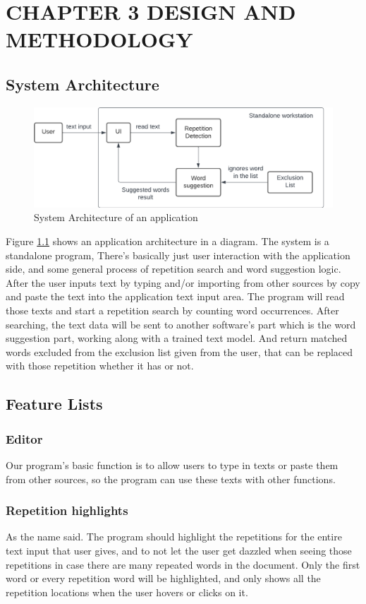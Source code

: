 \documentclass[12pt,oneside,openright,a4paper]{cpe-english-project}
\begin{document}
\chapter{CHAPTER 3 DESIGN AND METHODOLOGY}

\section{System Architecture}
\begin{figure}[!h]\centering
\includegraphics[width=15cm]{./img/chp3/SysArch.png}
\caption{System Architecture of an application}\label{fig:sysarch}
\end{figure}

Figure \ref{fig:sysarch} shows an application architecture in a diagram. The system is a standalone program, There’s basically just user interaction with the application side, and some general process of repetition search and word suggestion logic. After the user inputs text by typing and/or importing from other sources by copy and paste the text into the application text input area. The program will read those texts and start a repetition search by counting word occurrences.  After searching, the text data will be sent to another software’s part which is the word suggestion part, working along with a trained text model. And return matched words excluded from the exclusion list given from the user, that can be replaced with those repetition whether it has or not.

\section{Feature Lists}

\subsection{Editor}
	Our program’s basic function is to allow users to type in texts or paste them from other sources, so the program can use these texts with other functions.

\subsection{Repetition highlights}
	As the name said. The program should highlight the repetitions for the entire text input that user gives, and to not let the user get dazzled when seeing those repetitions in case there are many repeated words in the document. Only the first word or every repetition word will be highlighted, and only shows all the repetition locations when the user hovers or clicks on it.
\end{document}
